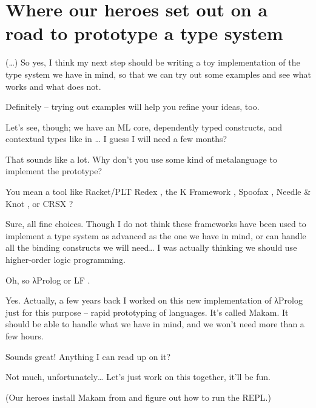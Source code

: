 \section{Where our heroes set out on a road to prototype a type
system}\label{where-our-heroes-set-out-on-a-road-to-prototype-a-type-system}

 (\ldots{}) So yes, I think my next step should be
writing a toy implementation of the type system we have in mind, so that
we can try out some examples and see what works and what does not.

 Definitely -- trying out examples will help you
refine your ideas, too.

\heroSTUDENT{} Let's see, though; we have an ML core, dependently typed
constructs, and contextual types like in
\citet{nanevski2008contextual}\ldots{} I guess I will need a few months?

\heroADVISOR{} That sounds like a lot. Why don't you use some kind of
metalanguage to implement the prototype?

\heroSTUDENT{} You mean a tool like Racket/PLT Redex
\citep{tobin2011languages,felleisen2009semantics}, the K Framework
\citep{rosu2010overview,ellison2009rewriting}, Spoofax
\citep{kats2010spoofax}, Needle \& Knot \citep{keuchel2016needle}, or
CRSX \citep{rose2011crsx}?

\heroADVISOR{} Sure, all fine choices. Though I do not think these frameworks
have been used to implement a type system as advanced as the one we have
in mind, or can handle all the binding constructs we will need\ldots{} I
was actually thinking we should use higher-order logic programming.

\heroSTUDENT{} Oh, so \foreignlanguage{greek}{λ}Prolog \citep{miller1988overview} or LF
\citep{pfenning1999system}.

\heroADVISOR{} Yes. Actually, a few years back I worked on this new
implementation of \foreignlanguage{greek}{λ}Prolog just for this purpose -- rapid prototyping of
languages. It's called Makam. It should be able to handle what we have
in mind, and we won't need more than a few hours.

\heroSTUDENT{} Sounds great! Anything I can read up on it?

\heroADVISOR{} Not much, unfortunately\ldots{} Let's just work on this
together, it'll be fun.

\begin{scenecomment}
(Our heroes install Makam from
\fi\xspace
and figure out how to run the REPL.)
\end{scenecomment}
